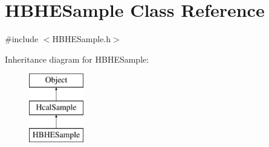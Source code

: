 \hypertarget{class_h_b_h_e_sample}{}\section{H\+B\+H\+E\+Sample Class Reference}
\label{class_h_b_h_e_sample}


{\ttfamily \#include $<$H\+B\+H\+E\+Sample.\+h$>$}

Inheritance diagram for H\+B\+H\+E\+Sample\+:\begin{figure}[H]
\begin{center}
\leavevmode
\includegraphics[height=3.000000cm]{class_h_b_h_e_sample}
\end{center}
\end{figure}
